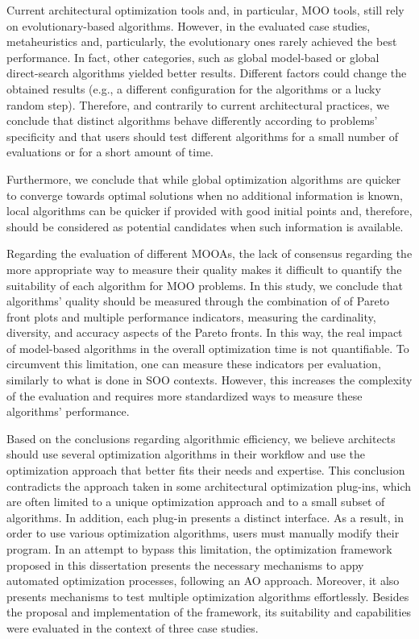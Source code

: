Current architectural optimization tools and, in particular, \ac{MOO} tools, still rely on evolutionary-based algorithms. However, in the evaluated case studies, metaheuristics and, particularly, the evolutionary ones rarely achieved the best performance. In fact, other categories, such as global model-based or global direct-search algorithms yielded better results. Different factors could change the obtained results (e.g., a different configuration for the algorithms or a lucky random step). Therefore, and contrarily to current architectural practices, we conclude that distinct algorithms behave differently according to  problems' specificity and that users should test different algorithms for a small number of evaluations or for a short amount of time. 

Furthermore, we conclude that while global optimization algorithms are quicker to converge towards optimal solutions when no additional information is known, local algorithms can be quicker if provided with good initial points and, therefore, should be considered as potential candidates when such information is available.

Regarding the evaluation of different \acp{MOOA}, the lack of consensus regarding the more appropriate way to measure their quality makes it difficult to quantify the suitability of each algorithm for \ac{MOO} problems. In this study, we conclude that algorithms' quality should be measured through the combination of of Pareto front plots and multiple performance indicators, measuring the cardinality, diversity, and accuracy aspects of the Pareto fronts. In this way, the real impact of model-based algorithms in the overall optimization time is not quantifiable. To circumvent this limitation, one can measure these indicators per evaluation, similarly to what is done in \ac{SOO} contexts. However, this increases the complexity of the evaluation and requires more standardized ways to measure these algorithms' performance.
 
Based on the conclusions regarding algorithmic efficiency, we believe architects should use several optimization algorithms in their workflow and use the optimization approach that better fits their needs and expertise. This conclusion contradicts the approach taken in some architectural optimization plug-ins, which are often limited to a unique optimization approach and to a small subset of algorithms. In addition, each plug-in presents a distinct interface. As a result, in order to use various optimization algorithms, users must manually modify their program. In an attempt to bypass this limitation, the optimization framework proposed in this dissertation presents the necessary mechanisms to appy automated optimization processes, following an \ac{AO} approach. Moreover, it also presents mechanisms to test multiple optimization algorithms effortlessly. Besides the proposal and implementation of the framework, its suitability and capabilities were evaluated in the context of three case studies.

